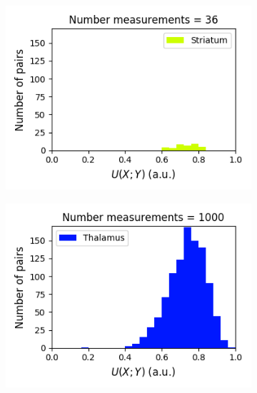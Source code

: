 \documentclass[a4paper,12pt]{article}
\theoremstyle{definition}
\begin{document}
\begin{figure}[p]
\begin{subfigure}{0.5\textwidth}
    \includegraphics[width=\textwidth]{figures/strong_striatum_14_1p0_symm_unc_histogram.png}
  \end{subfigure}
  \begin{subfigure}{0.5\textwidth}
    \centering
    \includegraphics[width=\textwidth]{figures/strong_thalamus_15_1p0_symm_unc_histogram.png}
  \end{subfigure}
  \begin{subfigure}{0.5\textwidth}
    \centering

\end{subfigure}
\end{figure}
\end{document}

